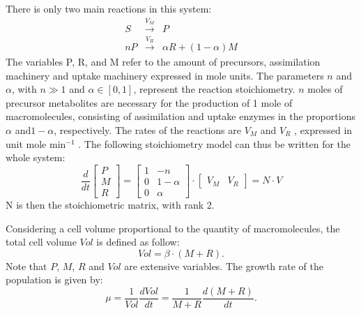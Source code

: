 \documentclass[a4paper, 10pt, conference]{ieeeconf}      %
\begin{document}
There is only two main reactions in this system:
\begin{eqnarray*}
S  &\overset{V_M}{\longrightarrow}& P \\
nP &\overset{V_R}{\longrightarrow}& \alpha R + (1-\alpha) M
\end{eqnarray*}
The variables P, R, and M refer to the amount of precursors, assimilation machinery and uptake machinery expressed in mole units.
The parameters $n$ and $\alpha$, with $n \gg 1$ and $\alpha \in [0,1]$, represent the reaction stoichiometry.
$n$ moles of precursor metabolites are necessary for the production of 1 mole of macromolecules, consisting of assimilation and uptake enzymes in the proportions $\alpha$ and$1 - \alpha$, respectively.
The rates of the reactions are $V_M$ and $V_R$ , expressed in unit mole min$^{-1}$ .
The following stoichiometry model can thus be written for the whole system:
\begin{equation}
\frac{d}{dt} \left[
\begin{matrix}
P\\
M\\
R
\end{matrix}
\right] = \left[
\begin{matrix}
1 &-n\\
0 & 1 - \alpha\\
0 & \alpha
\end{matrix}
\right] \cdot \left[
\begin{matrix}
V_M & V_R
\end{matrix}
\right] = N\cdot V
\end{equation}
N is then the stoichiometric matrix, with rank 2.

Considering a cell volume proportional to the quantity of macromolecules, the total cell volume $Vol$ is defined as follow:
\[
Vol=\beta\cdot(M+R).
\]
Note that $P$, $M$, $R$ and $Vol$ are extensive variables.
The growth rate of the population is given by:
\[
\mu = \frac{1}{Vol} \frac{dVol}{dt} = \frac{1}{M+R}\frac{d(M+R)}{dt}.
\]
\end{document}
